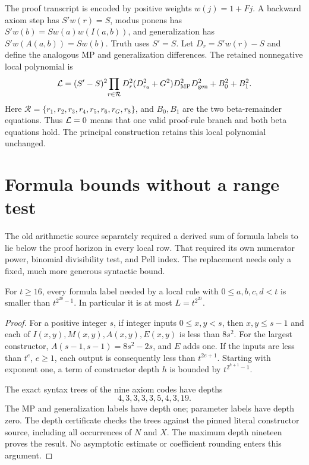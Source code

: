 The proof transcript is encoded by positive weights $w(j)=1+Fj$.
A backward axiom step has $S'w(r)=S$, modus ponens has
$S'w(b)=S w(a)w(I(a,b))$, and generalization has
$S'w(A(a,b))=S w(b)$. Truth uses $S'=S$.
Let $D_r=S'w(r)-S$ and define the analogous MP and generalization
differences. The retained nonnegative local polynomial is
\[
 \mathcal L=(S'-S)^2\!\prod_{r\in\mathcal R}D_r^2
       (D_{r_9}^2+G^2)D_{\rm MP}^2D_{\rm gen}^2+B_0^2+B_1^2.
\]
Here $\mathcal R=\{r_1,r_2,r_3,r_4,r_5,r_6,r_G,r_8\}$, and $B_0,B_1$ are the two beta-remainder equations. Thus $\mathcal L=0$
means that one valid proof-rule branch and both beta equations hold.
The principal construction retains this local polynomial unchanged.

\section{Formula bounds without a range test}

The old arithmetic source separately required a derived sum of formula
labels to lie below the proof horizon in every local row. That required
its own numerator power, binomial divisibility test, and Pell index.
The replacement needs only a fixed, much more generous syntactic bound.

\begin{lemma}\label{lem:depth}
For $t\ge16$, every formula label needed by a local rule with
$0\le a,b,c,d<t$ is smaller than $t^{2^{20}-1}$.
In particular it is at most $L=t^{2^{20}}$.
\end{lemma}
\begin{proof}
For a positive integer $s$, if integer inputs $0\le x,y<s$, then
$x,y\le s-1$ and each of
$I(x,y),M(x,y),A(x,y),E(x,y)$ is less than $8s^2$.
For the largest constructor,
$A(s-1,s-1)=8s^2-2s$, and $E$ adds one. If the inputs are
less than $t^e$, $e\ge1$, each output is consequently less than
$t^{2e+1}$. Starting with exponent one, a term of constructor depth
$h$ is bounded by $t^{2^{h+1}-1}$.

The exact syntax trees of the nine axiom codes have depths
\[
                 4,3,3,3,3,5,4,3,19.
\]
The MP and generalization labels have depth one; parameter labels have
depth zero. The depth certificate checks the trees against the pinned
literal constructor source, including all occurrences of $N$ and $X$.
The maximum depth nineteen proves the result. No asymptotic estimate or
coefficient rounding enters this argument.
\end{proof}

